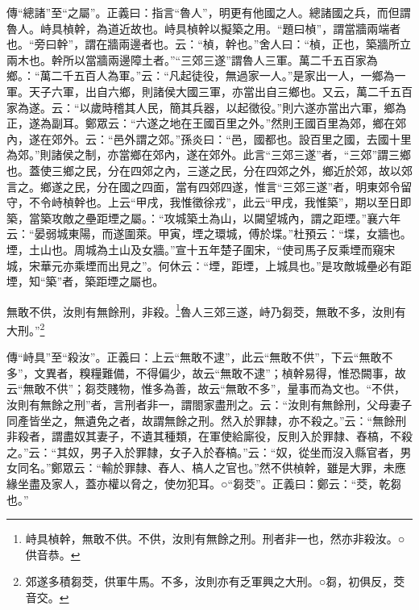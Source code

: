 {\noindent\zhuan{}\fzbyks 傳“總諸”至“之屬”。正義曰：指言“魯人”，明更有他國之人。總諸國之兵，而但謂魯人。峙具楨幹，為道近故也。峙具楨幹以擬築之用。“題曰楨”，謂當牆兩端者也。“旁曰幹”，謂在牆兩邊者也。云：“楨，幹也。”舍人曰：“楨，正也，築牆所立兩木也。幹所以當牆兩邊障土者。”“三郊三遂”謂魯人三軍。萬二千五百家為鄉。：“萬二千五百人為軍。”云：“凡起徒役，無過家一人。”是家出一人，一鄉為一軍。天子六軍，出自六鄉，則諸侯大國三軍，亦當出自三鄉也。又云，萬二千五百家為遂。云：“以歲時稽其人民，簡其兵器，以起徵役。”則六遂亦當出六軍，鄉為正，遂為副耳。鄭眾云：“六遂之地在王國百里之外。”然則王國百里為郊，鄉在郊內，遂在郊外。云：“邑外謂之郊。”孫炎曰：“邑，國都也。設百里之國，去國十里為郊。”則諸侯之制，亦當鄉在郊內，遂在郊外。此言“三郊三遂”者，“三郊”謂三鄉也。蓋使三鄉之民，分在四郊之內，三遂之民，分在四郊之外，鄉近於郊，故以郊言之。鄉遂之民，分在國之四面，當有四郊四遂，惟言“三郊三遂”者，明東郊令留守，不令峙楨幹也。上云“甲戌，我惟徵徐戎”，此云“甲戌，我惟築”，期以至日即築，當築攻敵之壘距堙之屬。：“攻城築土為山，以闚望城內，謂之距堙。”襄六年云：“晏弱城東陽，而遂圍萊。甲寅，堙之環城，傅於堞。”杜預云：“堞，女牆也。堙，土山也。周城為土山及女牆。”宣十五年楚子圍宋，“使司馬子反乘堙而窺宋城，宋華元亦乘堙而出見之”。何休云：“堙，距堙，上城具也。”是攻敵城壘必有距堙，知“築”者，築距堙之屬也。 \par}

無敢不供，汝則有無餘刑，非殺。\footnote{峙具楨幹，無敢不供。不供，汝則有無餘之刑。刑者非一也，然亦非殺汝。○供音恭。}魯人三郊三遂，峙乃芻茭，無敢不多，汝則有大刑。”\footnote{郊遂多積芻茭，供軍牛馬。不多，汝則亦有乏軍興之大刑。○芻，初俱反，茭音交。}

{\noindent\zhuan{}\fzbyks 傳“峙具”至“殺汝”。正義曰：上云“無敢不逮”，此云“無敢不供”，下云“無敢不多”，文異者，糗糧難備，不得偏少，故云“無敢不逮”；楨幹易得，惟恐闕事，故云“無敢不供”；芻茭賤物，惟多為善，故云“無敢不多”，量事而為文也。“不供，汝則有無餘之刑”者，言刑者非一，謂閤家盡刑之。云：“汝則有無餘刑，父母妻子同產皆坐之，無遺免之者，故謂無餘之刑。然入於罪隸，亦不殺之。”云：“無餘刑非殺者，謂盡奴其妻子，不遺其種類，在軍使給廝役，反則入於罪隸、舂槁，不殺之。”云：“其奴，男子入於罪隸，女子入於舂槁。”云：“奴，從坐而沒入縣官者，男女同名。”鄭眾云：“輸於罪隸、舂人、槁人之官也。”然不供楨幹，雖是大罪，未應緣坐盡及家人，蓋亦權以脅之，使勿犯耳。○“芻茭”。正義曰：鄭云：“茭，乾芻也。” \par}

